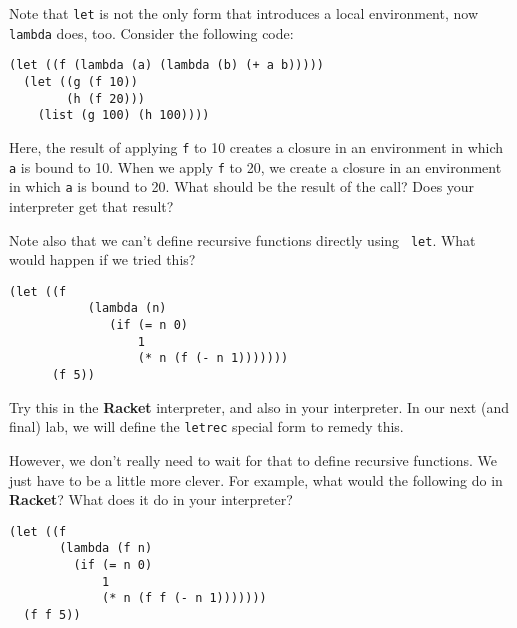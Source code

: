 \documentclass{article}
\begin{document}
Note that {\tt let} is not the only form that introduces a local
environment, now {\tt lambda} does, too.  Consider the following
code:
\begin{Verbatim}[frame=single]
(let ((f (lambda (a) (lambda (b) (+ a b)))))
  (let ((g (f 10))
        (h (f 20)))
    (list (g 100) (h 100))))  
\end{Verbatim}
Here, the result of applying {\tt f} to 10 creates a closure in an
environment in which {\tt a} is bound to 10.  When we apply {\tt f} to
20, we create a closure in an environment in which {\tt a} is bound to
20.  What should be the result of the call?  Does your interpreter get
that result?

Note also that we can't define recursive functions directly using {\tt
  let}.  What would happen if we tried this?
\begin{Verbatim}[frame=single]
  (let ((f
           (lambda (n)
              (if (= n 0)
                  1
                  (* n (f (- n 1)))))))
      (f 5))
\end{Verbatim}
Try this in the {\bf Racket} interpreter, and also in your
interpreter.
In our next (and final) lab, we will define the {\tt letrec} special
form to remedy this.

However, we don't really need to wait for that to define
recursive functions.  We just have to be a little more clever.
For example, what would the following do in {\bf Racket}?  What does
it do in your interpreter?
\begin{Verbatim}[frame=single]
(let ((f
       (lambda (f n)
         (if (= n 0)
             1
             (* n (f f (- n 1)))))))
  (f f 5))
\end{Verbatim}
\end{document}
